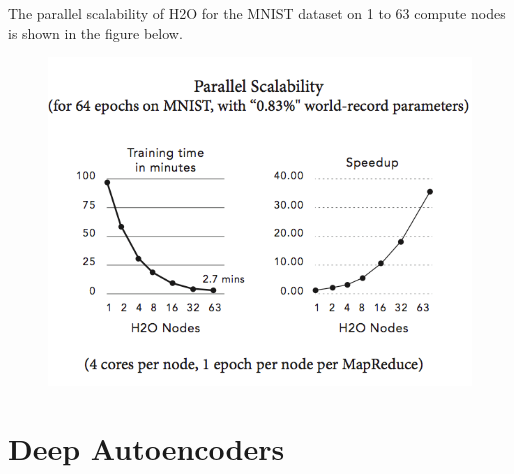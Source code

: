 The parallel scalability of H2O for the MNIST dataset on 1 to 63 compute nodes is shown in the figure below.
\begin{figure}[h!]
\centering
\includegraphics{scalability_new.png}
\end{figure}
\bigskip
\bigskip
\bigskip
\section{Deep Autoencoders}
\label{sec:DeepAutoencoders}  


